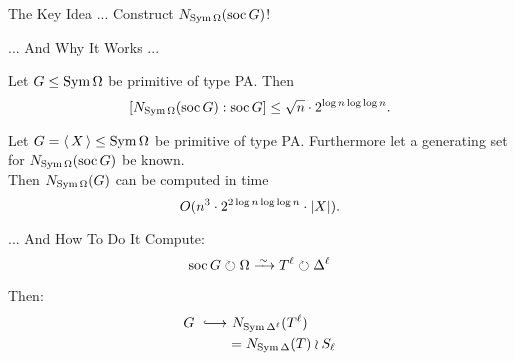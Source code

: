 \begin{frame}{The Key Idea ...}
    \centering
    {\Large
    Construct $N_{\operatorname{Sym} \Omega}(\operatorname{soc} G)$!
    }
\end{frame}

\begin{frame}{... And Why It Works ...}
    \begin{lemma}
        Let $G \leq \operatorname{Sym} \Omega$ be primitive of type PA.
        Then
        \vspace{-0.5em}
        \[
            [ N_{\operatorname{Sym} \Omega}(\operatorname{soc} G) : \operatorname{soc} G ]
            \leq \sqrt n \cdot 2 ^ {\log n \log \log n}.
        \]
    \end{lemma}
    \pause

    \begin{lemma}
        Let $G =  \left\langle \, X \, \right\rangle  \leq \operatorname{Sym} \Omega$ be primitive of type PA.
        Furthermore let a generating set for
        $N_{\operatorname{Sym} \Omega}(\operatorname{soc} G)$ be known.
        \\
        \pause
        Then $N_{\operatorname{Sym} \Omega}(G)$ can be computed in time
        \vspace{-0.5em}
        \[
            O(n ^ 3 \cdot 2 ^ {2 \log n \log \log n} \cdot  \left| X \right| ).
        \]
    \end{lemma}
\end{frame}


\begin{frame}{... And How To Do It}
    Compute:
    \[
        \soc G \circlearrowright \Omega
        \iso
        T ^ \ell \circlearrowright \Delta ^ \ell
    \]
    \pause

    Then:
    \begin{align*}
        G
        ~
        \lhook\joinrel\longrightarrow
        & ~ N_{\sym \Delta ^ \ell}(T ^ \ell)
        \\
        & =
        N_{\sym \Delta}(T) \wr S_\ell
    \end{align*}
\end{frame}

